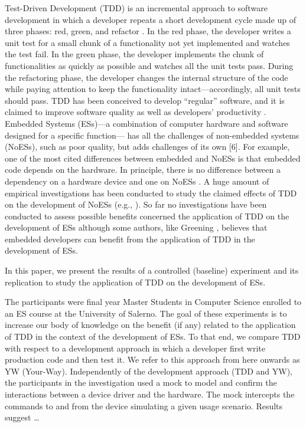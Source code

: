 Test-Driven Development (TDD) is an incremental approach to software development in which a developer repeats a short development cycle made up of three phases: red, green, and refactor \cite{TDDByExample}. In the red phase, the developer writes a unit test for a small chunk of a functionality not yet implemented and watches the test fail. In the green phase, the developer implements the chunk of functionalities as quickly as possible and watches all the unit tests pass. During the refactoring phase, the developer changes the internal structure of the code while paying attention to keep the functionality intact—accordingly, all unit tests should pass. TDD has been conceived to develop “regular” software, and it is claimed to improve software quality as well as developers' productivity \cite{DBLP:reference/se/ErdogmusMJ10}. Embedded Systems (ESs)—a combination of computer hardware and software designed for a specific function— has all the challenges of non-embedded systems (NoESs), such as poor quality, but adds challenges of its own [6]. 
For example, one of the most cited differences between embedded and NoESs is that embedded code depends on the hardware. In principle, there is no difference between a dependency on a hardware device and one on NoESs \cite{TDDEC}. A huge amount of empirical investigations has been conducted to study the claimed effects of TDD on the development of NoESs (e.g., \cite{DBLP:journals/software/KaracT18}). So far no investigations have been conducted to assess possible benefits concerned the application of TDD on the development of ESs although some authors, like Greening \cite{TDDEC}, believes that embedded developers can benefit from the application of TDD in the development of ESs.

In this paper, we present the results of a controlled (baseline) experiment and its replication to study the application of TDD on the development of ESs.

The participants were final year Master Students in Computer Science enrolled to an ES course at the University of Salerno. The goal of these experiments is to increase our body of knowledge on the benefit (if any) related to the application of TDD in the context of the development of ESs. To that end, we compare TDD with respect to a development approach in which a developer first write production code and then test it. We refer to this approach from here onwards as YW (Your-Way). Independently of the development approach (TDD and YW), the participants in the investigation used a mock to model and confirm the interactions between a device driver and the hardware. The mock intercepts the commands to and from the device simulating a given usage scenario. Results suggest \dots

